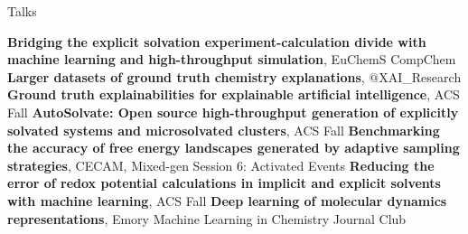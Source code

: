 \begin{rubric}{Talks}

\entry*[\hspace{1.05cm}2023] \textbf{Bridging the explicit solvation experiment-calculation divide with machine learning and high-throughput simulation}, EuChemS CompChem
\entry*[\hspace{1.05cm}2023] \textbf{Larger datasets of ground truth chemistry explanations}, $@$XAI\_Research
\entry*[\hspace{1.05cm}2022] \textbf{Ground truth explainabilities for explainable artificial intelligence}, ACS Fall
\entry*[\hspace{1.05cm}2022] \textbf{AutoSolvate: Open source high-throughput generation of explicitly solvated systems and microsolvated clusters}, ACS Fall
\entry*[\hspace{1.05cm}2021] \textbf{Benchmarking the accuracy of free energy landscapes generated by adaptive sampling strategies}, CECAM, Mixed-gen Session 6: Activated Events
\entry*[\hspace{1.05cm}2021] \textbf{Reducing the error of redox potential calculations in implicit and explicit solvents with machine learning}, ACS Fall
\entry*[\hspace{1.05cm}2020] \textbf{Deep learning of molecular dynamics representations}, Emory Machine Learning in Chemistry Journal Club
\end{rubric}



